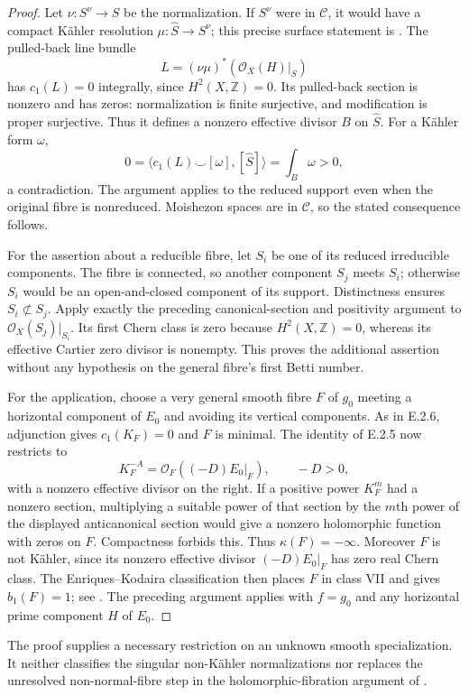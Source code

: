 \begin{proof}
Let $\nu:S^\nu\to S$ be the normalization.  If $S^\nu$ were
in $\mathcal C$, it would have a compact K\"ahler resolution
$\mu:\widehat S\to S^\nu$; this precise surface statement is
\citet[Lemma~3.3 and Corollary~3.4]{Fujino2021E}.
The pulled-back line bundle
\[
 L=(\nu\mu)^*(\mathcal O_X(H)|_S)
\]
has $c_1(L)=0$ integrally, since $H^2(X,\mathbb Z)=0$.
Its pulled-back section is nonzero and has zeros: normalization
is finite surjective, and modification is proper surjective.
Thus it defines a nonzero effective divisor $B$ on
$\widehat S$.  For a K\"ahler form $\omega$,
\[
 0=\langle c_1(L)\smile[\omega],[\widehat S]\rangle
   =\int_B\omega>0,
\]
a contradiction.  The argument applies to the reduced support
even when the original fibre is nonreduced.  Moishezon spaces
are in $\mathcal C$, so the stated consequence follows.

For the assertion about a reducible fibre, let $S_i$ be one
of its reduced irreducible components.  The fibre is connected,
so another component $S_j$ meets $S_i$; otherwise $S_i$ would
be an open-and-closed component of its support.  Distinctness
ensures $S_i\not\subset S_j$.  Apply exactly the preceding
canonical-section and positivity argument to
$\mathcal O_X(S_j)|_{S_i}$.  Its first Chern class is zero
because $H^2(X,\mathbb Z)=0$, whereas its effective Cartier
zero divisor is nonempty.  This proves the additional assertion
without any hypothesis on the general fibre's first Betti number.

For the application, choose a very general smooth fibre $F$
of $g_0$ meeting a horizontal component of $E_0$ and avoiding
its vertical components.  As in E.2.6, adjunction gives
$c_1(K_F)=0$ and $F$ is minimal.  The identity of E.2.5 now
restricts to
\[
 K_F^{-A}=\mathcal O_F((-D)E_0|_F),
 \qquad -D>0,
\]
with a nonzero effective divisor on the right.  If a positive
power $K_F^m$ had a nonzero section, multiplying a suitable
power of that section by the $m$th power of the displayed
anticanonical section would give a nonzero holomorphic
function with zeros on $F$.  Compactness forbids this.
Thus $\kappa(F)=-\infty$.  Moreover $F$ is not K\"ahler,
since its nonzero effective divisor $(-D)E_0|_F$ has zero
real Chern class.  The Enriques--Kodaira classification then
places $F$ in class VII and gives $b_1(F)=1$; see
\citet[Chapter~VI, Theorem~1.1 and Table~10, pp.~243--244]
{BHPV2004E}.  The preceding argument applies with $f=g_0$
and any horizontal prime component $H$ of $E_0$.
\end{proof}

The proof supplies a necessary restriction on an unknown
smooth specialization.  It neither classifies the singular
non-K\"ahler normalizations nor replaces the unresolved
non-normal-fibre step in the holomorphic-fibration argument
of \citet[\S7]{CDP2020D}.
